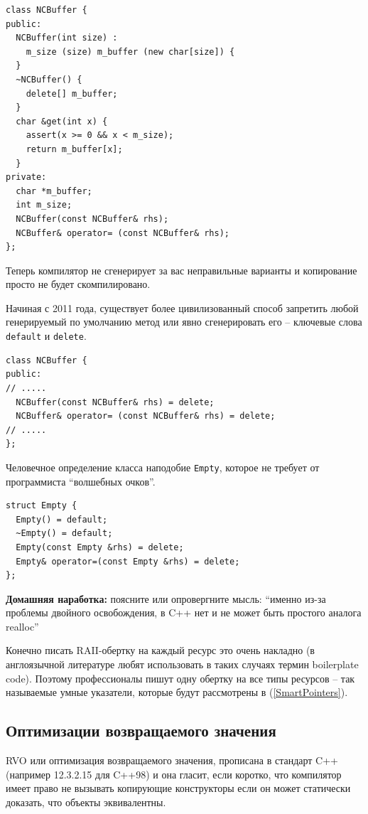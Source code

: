 \documentclass[a4paper,12pt,oneside]{book}
\begin{document}
\begin{lstlisting}
class NCBuffer {
public:
  NCBuffer(int size) : 
    m_size (size) m_buffer (new char[size]) {
  }
  ~NCBuffer() { 
    delete[] m_buffer; 
  }
  char &get(int x) { 
    assert(x >= 0 && x < m_size); 
    return m_buffer[x]; 
  }
private:
  char *m_buffer;
  int m_size;
  NCBuffer(const NCBuffer& rhs);
  NCBuffer& operator= (const NCBuffer& rhs);
};
\end{lstlisting}

Теперь компилятор не сгенерирует за вас неправильные варианты и копирование просто не будет скомпилировано.

Начиная с 2011 года, существует более цивилизованный способ запретить любой генерируемый по умолчанию метод или явно сгенерировать его -- ключевые слова \lstinline!default! и \lstinline!delete!.

\begin{lstlisting}
class NCBuffer {
public:
// .....
  NCBuffer(const NCBuffer& rhs) = delete;
  NCBuffer& operator= (const NCBuffer& rhs) = delete;
// .....
};
\end{lstlisting}

Человечное определение класса наподобие \lstinline!Empty!, которое не требует от программиста ``волшебных очков''.

\begin{lstlisting}
struct Empty {
  Empty() = default;
  ~Empty() = default;
  Empty(const Empty &rhs) = delete;
  Empty& operator=(const Empty &rhs) = delete;
};
\end{lstlisting}

\textbf{Домашняя наработка:} поясните или опровергните мысль: ``именно из-за проблемы двойного освобождения, в C++ нет и не может быть простого аналога realloc''

Конечно писать RAII-обертку на каждый ресурс это очень накладно (в англоязычной литературе любят использовать в таких случаях термин boilerplate code). Поэтому профессионалы пишут одну обертку на все типы ресурсов -- так называемые умные указатели, которые будут рассмотрены в (\ref{SmartPointers}).

\subsection{Оптимизации возвращаемого значения}\label{RVO}

RVO или оптимизация возвращаемого значения, прописана в стандарт C++ (например 12.3.2.15 для C++98) и она гласит, если коротко, что компилятор имеет право не вызывать копирующие конструкторы если он может статически доказать, что объекты эквивалентны.
\end{document}
